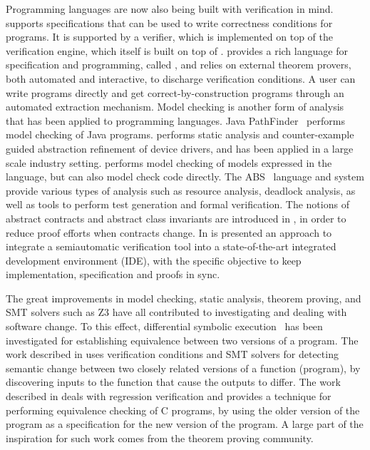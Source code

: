 Programming languages are now also being built with verification in
mind.  \dafny{} \cite{leino-lpar-2010} supports specifications that
can be used to write correctness conditions for programs.
It is supported by a verifier, which is implemented on top of the
\boogie{} verification engine, which itself is built on top of
\zthree.  \whythree{} \cite{filliatre-why3-2011} provides a rich
language for specification and programming, called \whyml{}, and
relies on external theorem provers, both automated and interactive, to
discharge verification conditions. A user can write \whyml{} programs
directly and get correct-by-construction \ocaml{} programs through an
automated extraction mechanism. Model checking is another form of
analysis that has been applied to programming languages.  Java
PathFinder~\cite{havelund-jpf-00,havelund-visser02} performs model
checking of Java programs. \slam{} \cite{ball2010slam2} performs
static analysis and counter-example guided abstraction refinement of
device drivers, and has been applied in a large scale industry
setting.  \spin{} \cite{holzmann-spin-2004} performs model checking of
models expressed in the \promela{} language, but can also model check
\clang{} code directly. The ABS~\cite{hahnle2012abstract} language and
system provide various types of analysis such as resource analysis,
deadlock analysis, as well as tools to perform test generation and
formal verification.
The notions of abstract contracts and abstract class invariants
are introduced in \cite{abstract-contracts-14}, in order 
to reduce proof efforts when contracts change. 
In \cite{interactive-IDE-14} is presented 
an approach to integrate a semiautomatic
verification tool into a state-of-the-art integrated development
environment (IDE), with the specific objective to keep implementation,
specification and proofs in sync. 

The great improvements in model checking, static analysis, theorem
proving, and SMT solvers such as Z3 have all
contributed to investigating and dealing with software change. To this
effect, differential symbolic execution~\cite{person2008differential}
has been investigated for establishing equivalence between two
versions of a program. The work described in \cite{lahiri2012symdiff}
uses verification conditions and SMT solvers for detecting semantic
change between two closely related versions of a function (program),
by discovering inputs to the function that cause the outputs to
differ. The work described in \cite{godlin2009regression} deals with
regression verification and provides a technique for performing
equivalence checking of C programs, by using the older version of the
program as a specification for the new version of the program. A large
part of the inspiration for such work comes from the theorem proving
community.

